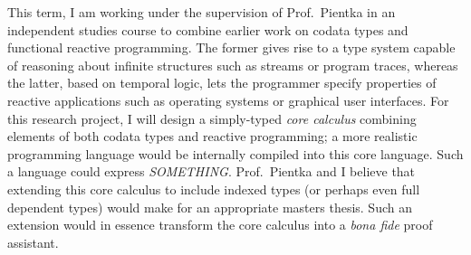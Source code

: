 \documentclass[11pt,letterpaper]{article}
\begin{document}
This term, I am working under the supervision of Prof.~Pientka in an
independent studies course to combine earlier work on codata types and
functional reactive programming. The former gives rise to a type system capable
of reasoning about infinite structures such as streams or program traces,
whereas the latter, based on temporal logic, lets the programmer specify
properties of reactive applications such as operating systems or graphical user
interfaces.
%
For this research project, I will design a simply-typed \emph{core calculus}
combining elements of both codata types and reactive programming; a more
realistic programming language would be internally compiled into this core
language. Such a language could express \emph{SOMETHING}. Prof.~Pientka and I
believe that extending this core calculus to include indexed types (or perhaps
even full dependent types) would make for an appropriate masters thesis. Such
an extension would in essence transform the core calculus into a \emph{bona
fide} proof assistant.
\end{document}
